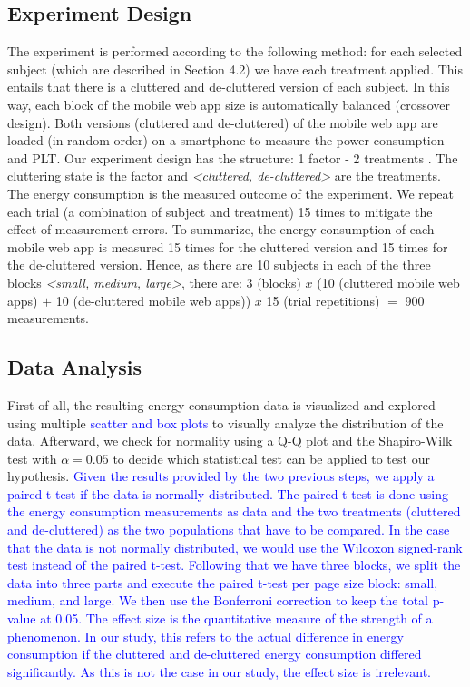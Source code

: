 
\subsection{Experiment Design}

The experiment is performed according to the following method: for each selected subject (which are described in Section 4.2) we have each treatment applied. This entails that there is a cluttered and de-cluttered version of each subject. In this way, each block of the mobile web app size is automatically balanced (crossover design). Both versions (cluttered and de-cluttered) of the mobile web app are loaded (in random order) on a smartphone to measure the power consumption and PLT. Our experiment design has the structure: 1 factor - 2 treatments \cite{wohlin2012experimentation}. The cluttering state is the factor and \textit{<cluttered, de-cluttered>} are the treatments. The energy consumption is the measured outcome of the experiment. We repeat each trial (a combination of subject and treatment) 15 times to mitigate the effect of measurement errors. To summarize, the energy consumption of each mobile web app is measured 15 times for the cluttered version and 15 times for the de-cluttered version. Hence, as there are 10 subjects in each of the three blocks \textit{<small, medium, large>}, there are:
3 (blocks) $x$ (10 (cluttered mobile web apps) $+$ 10 (de-cluttered mobile web apps)) $x$ 15 (trial repetitions) $=$ 900 measurements.

\subsection{Data Analysis}


First of all, the resulting energy consumption data is visualized and explored using multiple \textcolor{blue}{scatter and box plots} to visually analyze the distribution of the data.
Afterward, we check for normality using a Q-Q plot and the Shapiro-Wilk test with $\alpha = 0.05$ to decide which statistical test can be applied to test our hypothesis.
\textcolor{blue}{Given the results provided by the two previous steps, we apply a paired t-test if the data is normally distributed. The paired t-test is done using the energy consumption measurements as data and the two treatments (cluttered and de-cluttered) as the two populations that have to be compared. In the case that the data is not normally distributed, we would use the Wilcoxon signed-rank test instead of the paired t-test. Following that we have three blocks, we split the data into three parts and execute the paired t-test per page size block: small, medium, and large. We then use the Bonferroni correction to keep the total p-value at 0.05. The effect size is the quantitative measure of the strength of a phenomenon. In our study, this refers to the actual difference in energy consumption if the cluttered and de-cluttered energy consumption differed significantly. As this is not the case in our study, the effect size is irrelevant. }



